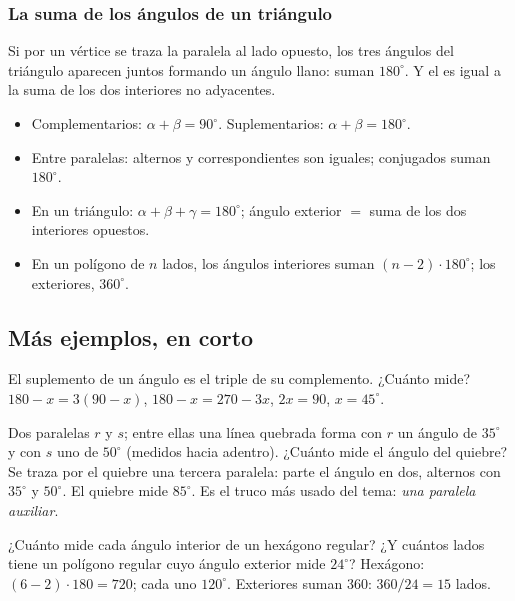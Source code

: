 \subsubsection{La suma de los ángulos de un triángulo}
Si por un vértice se traza la paralela al lado opuesto, los tres ángulos del triángulo aparecen juntos formando un
ángulo llano: suman $180^\circ$. Y el  es igual a la suma de los dos interiores no adyacentes.

\begin{regla}
\begin{itemize}
  \item Complementarios: $\alpha + \beta = 90^\circ$. Suplementarios: $\alpha + \beta = 180^\circ$.
  \item Entre paralelas: alternos y correspondientes son iguales; conjugados suman $180^\circ$.
  \item En un triángulo: $\alpha + \beta + \gamma = 180^\circ$; ángulo exterior $=$ suma de los dos interiores opuestos.
  \item En un polígono de $n$ lados, los ángulos interiores suman $(n - 2)\cdot 180^\circ$; los exteriores, $360^\circ$.
\end{itemize}
\end{regla}

\subsection{Más ejemplos, en corto}
\begin{ejemplo}
El suplemento de un ángulo es el triple de su complemento. ¿Cuánto mide?
\solucion $180 - x = 3(90 - x)$, $180 - x = 270 - 3x$, $2x = 90$, $x = 45^\circ$.
\end{ejemplo}

\begin{ejemplo}
Dos paralelas $r$ y $s$; entre ellas una línea quebrada forma con $r$ un ángulo de $35^\circ$ y con $s$ uno de $50^\circ$
(medidos hacia adentro). ¿Cuánto mide el ángulo del quiebre?
\solucion Se traza por el quiebre una tercera paralela: parte el ángulo en dos, alternos con $35^\circ$ y $50^\circ$.
El quiebre mide $85^\circ$. Es el truco más usado del tema: \emph{una paralela auxiliar}.
\end{ejemplo}

\begin{ejemplo}
¿Cuánto mide cada ángulo interior de un hexágono regular? ¿Y cuántos lados tiene un polígono regular cuyo ángulo
exterior mide $24^\circ$?
\solucion Hexágono: $(6 - 2)\cdot 180 = 720$; cada uno $120^\circ$. Exteriores suman 360: $360 / 24 = 15$ lados.
\end{ejemplo}

